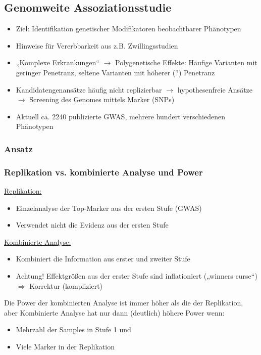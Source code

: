 \subsection{Genomweite Assoziationsstudie}
\begin{itemize}
	\item Ziel: Identifikation genetischer Modifikatoren beobachtbarer Phänotypen
	\item Hinweise für Vererbbarkeit aus z.B. Zwillingsstudien
	\item „Komplexe Erkrankungen“ $\rightarrow$ Polygenetische Effekte: Häufige Varianten mit geringer Penetranz, seltene Varianten mit höherer (?) Penetranz
	\item Kandidatengenansätze häufig nicht replizierbar $\rightarrow$ hypothesenfreie Ansätze $\rightarrow$ Screening des Genomes mittels Marker (SNPs)
	\item Aktuell ca. 2240 publizierte GWAS, mehrere hundert verschiedenen Phänotypen
\end{itemize}

\subsubsection{Ansatz}

\subsubsection{Replikation vs. kombinierte Analyse und Power}
\underline{Replikation:}
\begin{itemize}
	\item Einzelanalyse der Top-Marker aus der ersten Stufe (GWAS)
	\item Verwendet nicht die Evidenz aus der ersten Stufe

\end{itemize}

\underline{Kombinierte Analyse:}
\begin{itemize}
	\item Kombiniert die Information aus erster und zweiter Stufe
	\item Achtung! Effektgrößen aus der erster Stufe sind inflationiert („winners curse“) $\Rightarrow$ Korrektur (kompliziert)
\end{itemize} 

Die Power der kombinierten Analyse ist immer höher als die der
Replikation, aber Kombinierte Analyse hat nur dann (deutlich) höhere Power wenn:
\begin{itemize}
	\item Mehrzahl der Samples in Stufe 1 und
	\item Viele Marker in der Replikation
\end{itemize}

